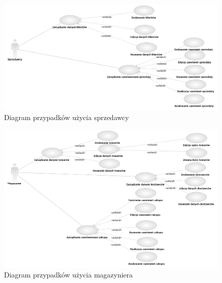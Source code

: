 \begin{figure}[ht]
  \begin{center}
    \includegraphics[angle=-90,scale=0.75]{../img/sprzedawcaUseCase.png}
  \end{center}
  \caption{Diagram przypadków użycia sprzedawcy}
  \label{fig:sprzedawcaUseCase}
\end{figure}


\begin{figure}[ht]
  \begin{center}
    \includegraphics[angle=-90,scale=0.7]{../img/magazynierUseCase.png}
    \caption{Diagram przypadków użycia magazyniera}
    \label{fig:magazynierUseCase}
  \end{center}
\end{figure}

